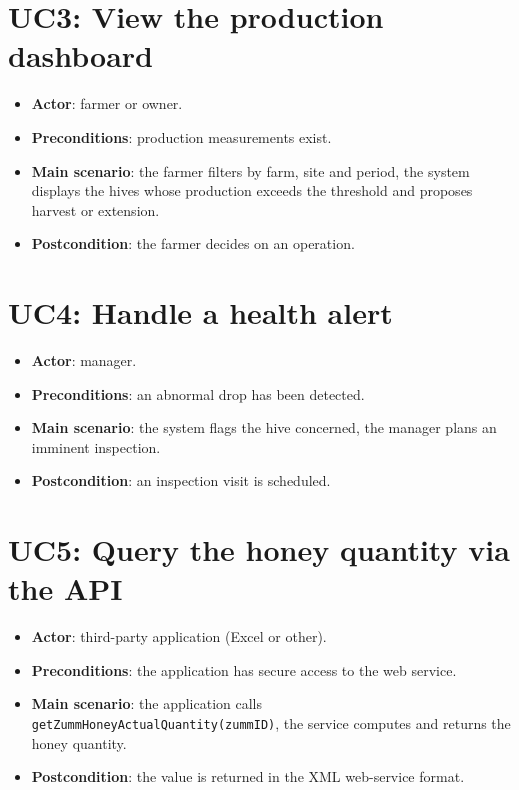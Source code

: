 \section{UC3: View the production dashboard}
\begin{itemize}
  \item \textbf{Actor}: farmer or owner.
  \item \textbf{Preconditions}: production measurements exist.
  \item \textbf{Main scenario}: the farmer filters by farm, site and period, the system displays the hives whose production exceeds the threshold and proposes harvest or extension.
  \item \textbf{Postcondition}: the farmer decides on an operation.
\end{itemize}

\section{UC4: Handle a health alert}
\begin{itemize}
  \item \textbf{Actor}: manager.
  \item \textbf{Preconditions}: an abnormal drop has been detected.
  \item \textbf{Main scenario}: the system flags the hive concerned, the manager plans an imminent inspection.
  \item \textbf{Postcondition}: an inspection visit is scheduled.
\end{itemize}

\section{UC5: Query the honey quantity via the API}
\begin{itemize}
  \item \textbf{Actor}: third-party application (Excel or other).
  \item \textbf{Preconditions}: the application has secure access to the web service.
  \item \textbf{Main scenario}: the application calls \texttt{getZummHoneyActualQuantity(zummID)}, the service computes and returns the honey quantity.
  \item \textbf{Postcondition}: the value is returned in the XML web-service format.
\end{itemize}
